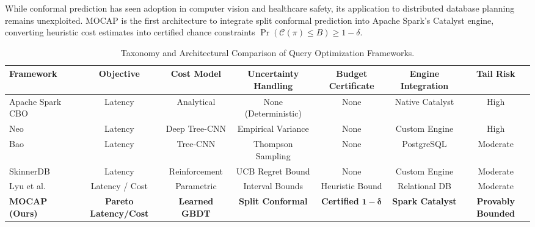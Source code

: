 While conformal prediction has seen adoption in computer vision and healthcare safety, its application to distributed database planning remains unexploited. MOCAP is the first architecture to integrate split conformal prediction into Apache Spark's Catalyst engine, converting heuristic cost estimates into certified chance constraints $\Pr(\mathcal{C}(\pi) \le B) \ge 1 - \delta$.

\begin{table}[t]
\centering
\caption{Taxonomy and Architectural Comparison of Query Optimization Frameworks.}
\label{tab:taxonomy_summary}
\small
\begin{tabular}{lcccccc}
\toprule
\textbf{Framework} & \textbf{Objective} & \textbf{Cost Model} & \textbf{Uncertainty Handling} & \textbf{Budget Certificate} & \textbf{Engine Integration} & \textbf{Tail Risk} \\
\midrule
Apache Spark CBO~\cite{armbrust2015spark} & Latency & Analytical & None (Deterministic) & None & Native Catalyst & High \\
Neo~\cite{marcus2019neo} & Latency & Deep Tree-CNN & Empirical Variance & None & Custom Engine & High \\
Bao~\cite{marcus2021bao} & Latency & Tree-CNN & Thompson Sampling & None & PostgreSQL & Moderate \\
SkinnerDB~\cite{trummer2019skinnerdb} & Latency & Reinforcement & UCB Regret Bound & None & Custom Engine & Moderate \\
Lyu et al.~\cite{lyu2018multiobjective} & Latency / Cost & Parametric & Interval Bounds & Heuristic Bound & Relational DB & Moderate \\
\textbf{MOCAP (Ours)} & \textbf{Pareto Latency/Cost} & \textbf{Learned GBDT} & \textbf{Split Conformal} & \textbf{Certified } $\mathbf{1 - \delta}$ & \textbf{Spark Catalyst} & \textbf{Provably Bounded} \\
\bottomrule
\end{tabular}
\end{table}
